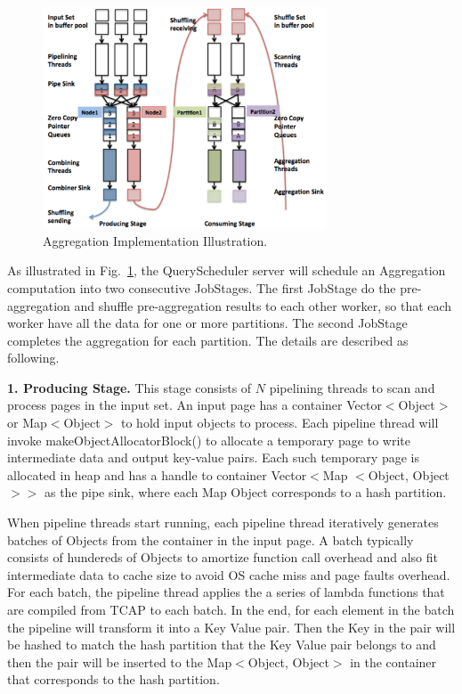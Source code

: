 \begin{figure}
\centering
\includegraphics[width=0.75\textwidth]{aggregation.pdf}
  \caption{\label{fig:aggregation} Aggregation Implementation Illustration.}
\end{figure}

As illustrated in Fig.~\ref{fig:aggregation}, the QueryScheduler server will schedule an Aggregation computation into two consecutive JobStages. The first JobStage do the pre-aggregation and shuffle pre-aggregation results to each other worker, so that each worker have all the data for one or more partitions. The second JobStage completes the aggregation for each partition. The details are described as following.

\vspace{5pt}
{\bf 1. Producing Stage.} This stage consists of $N$ pipelining threads to scan and process pages in the input set. An input page has a container Vector$<$Object$>$ or Map$<$Object$>$ to hold input objects to process. Each pipeline thread will invoke makeObjectAllocatorBlock() to allocate a temporary page to write intermediate data and output key-value pairs. Each such temporary page is allocated in heap and has a handle to container Vector$<$Map $<$Object, Object$>$$>$ as the pipe sink, where each Map Object corresponds to a hash partition. 

When pipeline threads start running, each pipeline thread iteratively generates batches of Objects from the container in the input page. A batch typically consists of hundereds of Objects to amortize function call overhead and also fit intermediate data to cache size to avoid OS cache miss and page faults overhead. For each batch, the pipeline thread applies the a series of lambda functions that are compiled from TCAP to each batch. In the end, for each element in the batch the pipeline will transform it into a Key Value pair. Then the Key in the pair will be hashed to match the hash partition that the Key Value pair belongs to and then the pair will be inserted to the Map$<$Object, Object$>$ in the container that corresponds to the hash partition.


